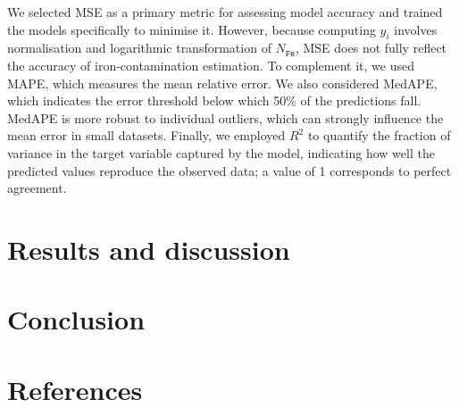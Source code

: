 \documentclass[10pt]{iopart}
\begin{document}
We selected MSE as a primary metric for assessing model accuracy and trained the models specifically to minimise it. 
However, because computing $y_i$ involves normalisation and logarithmic transformation of $N_\mathtt{Fe}$, MSE does not fully reflect the accuracy of iron-contamination estimation. 
To complement it, we used MAPE, which measures the mean relative error.
We also considered MedAPE, which indicates the error threshold below which 50\% of the predictions fall. 
MedAPE is more robust to individual outliers, which can strongly influence the mean error in small datasets. 
Finally, we employed $R^2$ to quantify the fraction of variance in the target variable captured by the model, indicating how well the predicted values reproduce the observed data; a value of 1 corresponds to perfect agreement.

\section{Results and discussion}\label{sec:Rez}


\section{Conclusion}

\section*{References}



\end{document}
